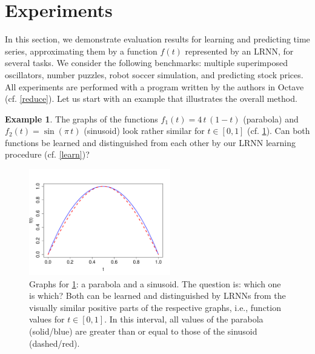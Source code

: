 \documentclass[twoside,11pt]{article}
\theoremstyle{definition}
\newtheorem{exmp}{Example}
\begin{document}
\section{Experiments}\label{result}

In this section, we demonstrate evaluation results for learning and predicting
time series, approximating them by a function $f(t)$ represented by an LRNN,
for several tasks. We consider the following benchmarks: multiple superimposed
oscillators, number puzzles, robot soccer simulation, and predicting stock
prices. All experiments are performed with a program written by the authors in
Octave \citep{EB+17} (cf. \cref{reduce}). Let us start with an example that
illustrates the overall method.

\begin{exmp}\label{quest}
The graphs of the functions $f_1(t) = 4\,t\,(1-t)$ (parabola) and $f_2(t) =
\sin(\pi\,t)$ (sinusoid) look rather similar for $t \in [0,1]$ (cf.
\cref{parasin}). Can both functions be learned and distinguished from each other
by our LRNN learning procedure (cf. \cref{learn})?
\end{exmp}

\begin{figure}
	\centering
	\includegraphics[width=0.55\textwidth]{fig/parasin2}
	\caption{Graphs for \cref{quest}: a parabola and a sinusoid.
	The question is: which one is which? Both can be learned and
	distinguished by LRNNs from the visually similar positive parts of the
	respective graphs, i.e., function values for $t \in [0, 1]$. In this
	interval, all values of the parabola (solid/blue) are greater than or equal
	to those of the sinusoid (dashed/red).}
	\label{parasin}
\end{figure}
\end{document}
